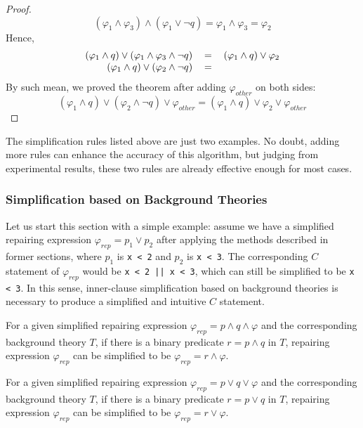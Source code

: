 \begin{proof}
\begin{equation}
(\varphi _{1} \wedge \varphi _{3}) \wedge (\varphi _{1} \vee \neg q) = \varphi _{1} \wedge \varphi _{3} = \varphi _{2}
\end{equation}
Hence,
\begin{equation}
\begin{tabular}{rcl}
$(\varphi _{1} \wedge q) \vee (\varphi _{1} \wedge \varphi _{3} \wedge \neg q)$&$=$&$(\varphi _{1} \wedge q) \vee \varphi _{2}$ \\
$(\varphi _{1} \wedge q) \vee (\varphi _{2} \wedge \neg q)$&$=$& \\
\end{tabular}
\end{equation}
By such mean, we proved the theorem after adding $\varphi _{other}$ on both sides:
\begin{equation}
(\varphi _{1} \wedge q) \vee (\varphi _{2} \wedge \neg q) \vee \varphi _{other} = (\varphi _{1} \wedge q) \vee \varphi _{2} \vee \varphi _{other}
\end{equation}
\end{proof}

The simplification rules listed above are just two examples.
No doubt, adding more rules can enhance the accuracy of this algorithm,
but judging from experimental results, these two rules are already effective enough for most cases.

\subsubsection{Simplification based on Background Theories}
\label{section:SimplificationBasedOnBackgroundTheories}
Let us start this section with a simple example: assume we have a simplified repairing expression $\varphi _{rep} = p _{1} \vee p _{2}$ after applying the methods described in former sections,
where $p _{1}$ is \lstinline|x < 2| and $p _{2}$ is \lstinline|x < 3|. The corresponding $C$ statement of $\varphi _{rep}$ would be \lstinline{x < 2 || x < 3}, which can still be simplified to be \lstinline|x < 3|.
In this sense, inner-clause simplification based on background theories is necessary to produce a simplified and intuitive $C$ statement.

\begin{theorem}
\label{theorem:1}
For a given simplified repairing expression $\varphi _{rep} = p \wedge q \wedge \varphi$ and the corresponding background theory $T$, if there is a binary predicate $r = p \wedge q$ in $T$,
repairing expression $\varphi _{rep}$ can be simplified to be $\varphi _{rep} = r \wedge \varphi$.
\end{theorem}
\begin{theorem}
\label{theorem:2}
For a given simplified repairing expression $\varphi _{rep} = p \vee q \vee \varphi$ and the corresponding background theory $T$, if there is a binary predicate $r = p \vee q$ in $T$,
repairing expression $\varphi _{rep}$ can be simplified to be $\varphi _{rep} = r \vee \varphi$.
\end{theorem}

